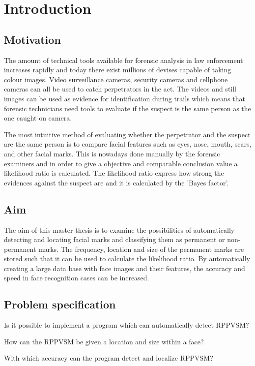 \section{Introduction}
\subsection{Motivation}
The amount of technical tools available for forensic analysis in law enforcement increases rapidly and today there exist millions of devises capable of taking colour images. Video surveillance cameras, security cameras and cellphone cameras can all be used to catch perpetrators in the act. The videos and still images can be used as evidence for identification during trails which means that forensic technicians need tools to evaluate if the suspect is the same person as the one caught on camera.

The most intuitive method of evaluating whether the perpetrator and the suspect are the same person is to compare facial features such as eyes, nose, mouth, scars, and other facial marks. This is nowadays done manually \cite{face_soft} by the forensic examiners and in order to give a objective and comparable conclusion value a likelihood ratio \cite{NFC_stat} is calculated. The likelihood ratio express how strong the evidences against the suspect are and it is calculated by the 'Bayes factor'.  

\subsection{Aim}

The aim of this master thesis is to examine the possibilities of automatically detecting and locating facial marks and classifying them as permanent or non-permanent marks. The frequency, location and size of the permanent marks are stored such that it can be used to calculate the likelihood ratio. By automatically creating a large data base with face images and their features, the accuracy and speed in face recognition cases can be increased. 

\subsection{Problem specification}

\begin{displayquote}
	Is it possible to implement a program which can automatically detect RPPVSM?

	How can the RPPVSM be given a location and size within a face?

	With which accuracy can the program detect and localize RPPVSM?
\end{displayquote}



